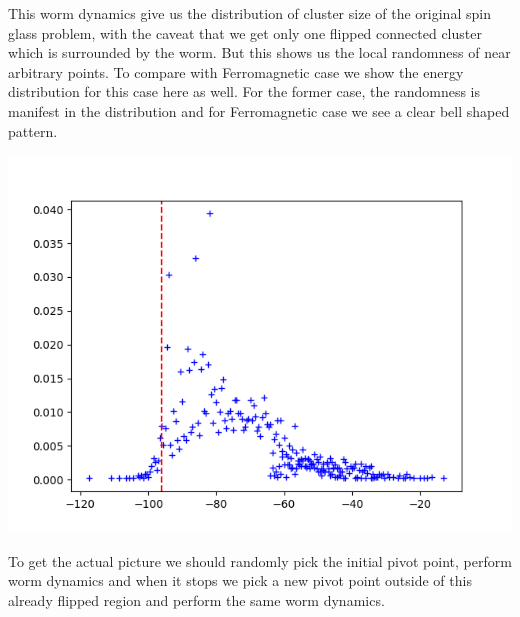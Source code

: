 \documentclass{article}
\begin{document}
	This worm dynamics give us the distribution of cluster size of the original spin glass problem, with the caveat that we get only one flipped connected cluster which is surrounded by the worm. But this shows us the local randomness of near arbitrary points. To compare with Ferromagnetic case we show the energy distribution for this case here as well. For the former case, the randomness is manifest in the distribution and for Ferromagnetic case we see a clear bell shaped pattern. 
\begin{center}
	\includegraphics[scale=0.5]{Ferromagnet Energy Distribution.png}
\end{center}
	 To get the actual picture we should randomly pick the initial pivot point, perform worm dynamics and when it stops we pick a new pivot point outside of this already flipped region and perform the same worm dynamics. 
	
	
\end{document}
